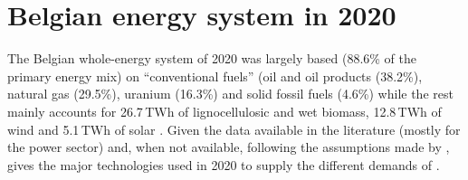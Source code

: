 \section{Belgian energy system in 2020} 
\label{app:bel_2020}
The Belgian whole-energy system of 2020 was largely based (88.6\% of the primary energy mix) on ``conventional fuels'' (\ie oil and oil products (38.2\%), natural gas (29.5\%), uranium (16.3\%) and solid fossil fuels (4.6\%) while the rest mainly accounts for 26.7\,TWh of lignocellulosic and wet biomass, 12.8\,TWh of wind and 5.1\,TWh of solar \cite{spf_economy_2022}. Given the data available in the literature (mostly for the power sector) and, when not available, following the assumptions made by \citet{Limpens2020},  gives the major technologies used in 2020 to supply the different demands of .

